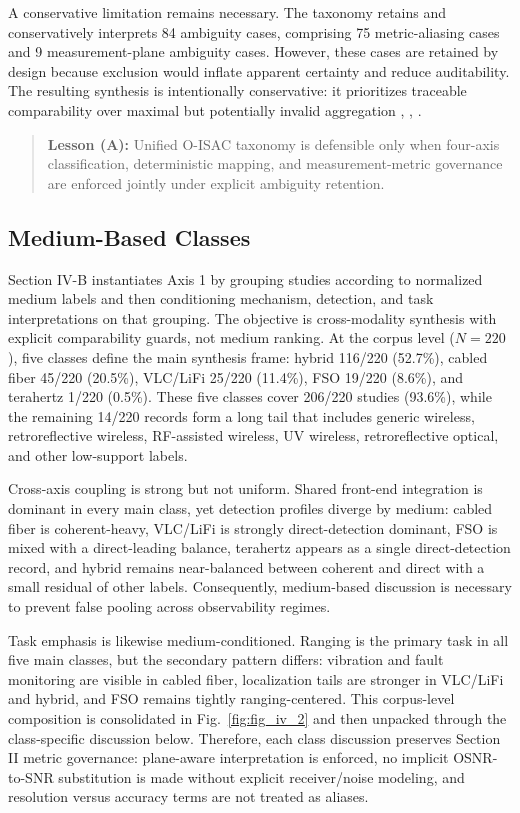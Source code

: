 A conservative limitation remains necessary. The taxonomy retains and conservatively interprets 84 ambiguity cases, comprising 75 metric-aliasing cases and 9 measurement-plane ambiguity cases. However, these cases are retained by design because exclusion would inflate apparent certainty and reduce auditability. The resulting synthesis is intentionally conservative: it prioritizes traceable comparability over maximal but potentially invalid aggregation \cite{O_ISAC_021}, \cite{O_ISAC_039}, \cite{O_ISAC_077}.

\begin{quote}
\textbf{Lesson (A):} Unified O-ISAC taxonomy is defensible only when four-axis classification, deterministic mapping, and measurement-metric governance are enforced jointly under explicit ambiguity retention.
\end{quote}

\subsection{Medium-Based Classes}
Section IV-B instantiates Axis 1 by grouping studies according to normalized medium labels and then conditioning mechanism, detection, and task interpretations on that grouping. The objective is cross-modality synthesis with explicit comparability guards, not medium ranking. At the corpus level ($N=220$), five classes define the main synthesis frame: hybrid 116/220 (52.7\%), cabled fiber 45/220 (20.5\%), VLC/LiFi 25/220 (11.4\%), FSO 19/220 (8.6\%), and terahertz 1/220 (0.5\%). These five classes cover 206/220 studies (93.6\%), while the remaining 14/220 records form a long tail that includes generic wireless, retroreflective wireless, RF-assisted wireless, UV wireless, retroreflective optical, and other low-support labels.

Cross-axis coupling is strong but not uniform. Shared front-end integration is dominant in every main class, yet detection profiles diverge by medium: cabled fiber is coherent-heavy, VLC/LiFi is strongly direct-detection dominant, FSO is mixed with a direct-leading balance, terahertz appears as a single direct-detection record, and hybrid remains near-balanced between coherent and direct with a small residual of other labels. Consequently, medium-based discussion is necessary to prevent false pooling across observability regimes.

Task emphasis is likewise medium-conditioned. Ranging is the primary task in all five main classes, but the secondary pattern differs: vibration and fault monitoring are visible in cabled fiber, localization tails are stronger in VLC/LiFi and hybrid, and FSO remains tightly ranging-centered. This corpus-level composition is consolidated in Fig.~\ref{fig:fig_iv_2} and then unpacked through the class-specific discussion below. Therefore, each class discussion preserves Section II metric governance: plane-aware interpretation is enforced, no implicit OSNR-to-SNR substitution is made without explicit receiver/noise modeling, and resolution versus accuracy terms are not treated as aliases.

